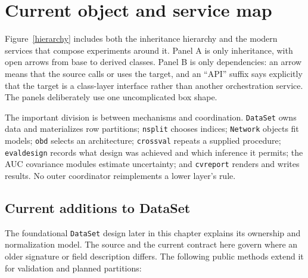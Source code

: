 \begingroup
\sloppy

\section{Current object and service map}\label{modern_objects}

Figure~\ref{hierarchy} includes both the inheritance hierarchy and the modern
services that compose experiments around it.  Panel A is only inheritance, with
open arrows from base to derived classes.  Panel B is only dependencies: an
arrow means that the source calls or uses the target, and an ``API'' suffix says
explicitly that the target is a class-layer interface rather than another
orchestration service.  The panels deliberately use one uncomplicated box shape.

The important division is between mechanisms and coordination.  \texttt{DataSet}
owns data and materializes row partitions; \texttt{nsplit} chooses indices;
\texttt{Network} objects fit models; \texttt{obd} selects an architecture;
\texttt{crossval} repeats a supplied procedure; \texttt{evaldesign} records what
design was achieved and which inference it permits; the AUC covariance modules
estimate uncertainty; and \texttt{cvreport} renders and writes results.  No
outer coordinator reimplements a lower layer's rule.

\subsection{Current additions to DataSet}

The foundational \texttt{DataSet} design later in this chapter explains its
ownership and normalization model.  The source and the current contract here
govern where an older signature or field description differs.  The following
public methods extend it for validation and planned partitions:

